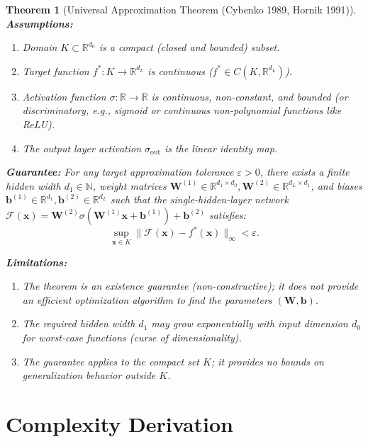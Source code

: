 \documentclass[11pt]{article}
\newtheorem{theorem}{Theorem}
\begin{document}
\begin{theorem}[Universal Approximation Theorem (Cybenko 1989, Hornik 1991)]
\label{thm:universal_approx}
\textbf{Assumptions:}
\begin{enumerate}
    \item Domain $K \subset \mathbb{R}^{d_0}$ is a compact (closed and bounded) subset.
    \item Target function $f^*: K \to \mathbb{R}^{d_L}$ is continuous ($f^* \in C(K, \mathbb{R}^{d_L})$).
    \item Activation function $\sigma: \mathbb{R} \to \mathbb{R}$ is continuous, non-constant, and bounded (or discriminatory, e.g., sigmoid or continuous non-polynomial functions like ReLU).
    \item The output layer activation $\sigma_{\text{out}}$ is the linear identity map.
\end{enumerate}

\textbf{Guarantee:}
For any target approximation tolerance $\varepsilon > 0$, there exists a finite hidden width $d_1 \in \mathbb{N}$, weight matrices $\mathbf{W}^{(1)} \in \mathbb{R}^{d_1 \times d_0}, \mathbf{W}^{(2)} \in \mathbb{R}^{d_L \times d_1}$, and biases $\mathbf{b}^{(1)} \in \mathbb{R}^{d_1}, \mathbf{b}^{(2)} \in \mathbb{R}^{d_L}$ such that the single-hidden-layer network $\mathcal{F}(\mathbf{x}) = \mathbf{W}^{(2)} \sigma(\mathbf{W}^{(1)} \mathbf{x} + \mathbf{b}^{(1)}) + \mathbf{b}^{(2)}$ satisfies:
\begin{equation}
\sup_{\mathbf{x} \in K} \|\mathcal{F}(\mathbf{x}) - f^*(\mathbf{x})\|_\infty < \varepsilon.
\end{equation}

\textbf{Limitations:}
\begin{enumerate}
    \item The theorem is an \emph{existence guarantee} (non-constructive); it does not provide an efficient optimization algorithm to find the parameters $(\mathbf{W}, \mathbf{b})$.
    \item The required hidden width $d_1$ may grow exponentially with input dimension $d_0$ for worst-case functions (curse of dimensionality).
    \item The guarantee applies to the compact set $K$; it provides no bounds on generalization behavior outside $K$.
\end{enumerate}
\end{theorem}

\section{Complexity Derivation}
\label{sec:complexity}
\end{document}
